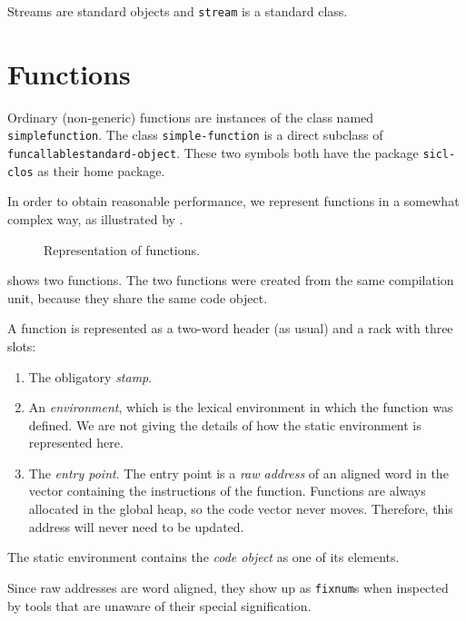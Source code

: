 Streams are standard objects and \texttt{stream} is a standard class.

\section{Functions}
\label{sec-data-representation-functions}

Ordinary (non-generic) \sysname{} functions are instances of the class
named \texttt{simple\-function}.  The class \texttt{simple-function}
is a direct subclass of \texttt{funcallable\-standard-object}.  These
two symbols both have the package \texttt{sicl-clos} as their home
package.

In order to obtain reasonable performance, we represent functions in a
somewhat complex way, as illustrated by
.

\begin{figure}
\begin{center}
\end{center}
\caption{\label{fig-function-representation}
Representation of functions.}
\end{figure}

 shows two functions.  The two
functions were created from the same compilation unit, because they
share the same code object. 

A function is represented as a two-word header (as usual) and a
rack with three slots:

\begin{enumerate}
\item The obligatory \emph{stamp}.
\item An \emph{environment}, which is the lexical environment in which
  the function was defined.  We are not giving the details of how the
  static environment is represented here.
\item The \emph{entry point}.  The entry
  point is a \emph{raw address} of an aligned word in the vector
  containing the instructions of the function.  Functions are always
  allocated in the global heap, so the code vector never moves.
  Therefore, this address will never need to be updated.
\end{enumerate}

The static environment contains the \emph{code object} as one of its
elements.

Since raw addresses are word aligned, they show up as \texttt{fixnum}s
when inspected by tools that are unaware of their special
signification.

